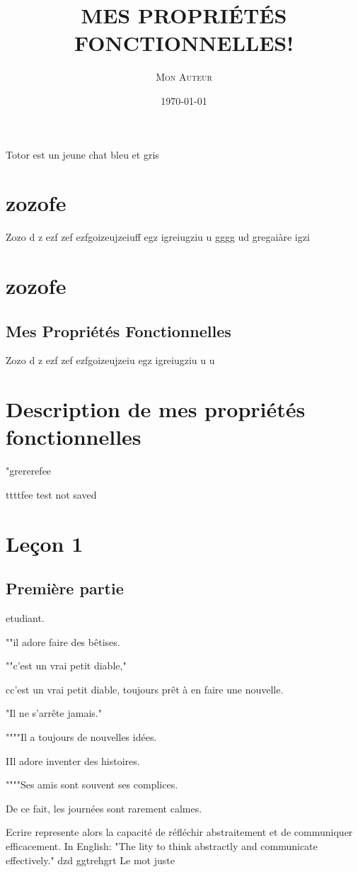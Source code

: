 \documentclass{article}
\title{\MakeUppercase{\textsc{Mes Propriétés Fonctionnelles!}}}
\author{\textsc{Mon Auteur}}
\date{\today}
\begin{document}
\maketitle

Totor est un jeune chat bleu et gris

\section{zozofe}

Zozo d
z
ezf
zef
ezfgoizeujzeiuff
egz
igreiugziu
u
gggg
ud
gregaiàre
igzi


\section{zozofe} \subsection{Mes Propriétés Fonctionnelles} Zozo d z ezf zef ezfgoizeujzeiu egz igreiugziu u u \section{Description de mes propriétés fonctionnelles}"grererefee

ttttfee
test
not saved

\section{Leçon 1} \subsection{Première partie}

etudiant.

""il adore faire des bêtises.

""c'est un vrai petit diable,"

cc'est un vrai petit diable, toujours prêt à en faire une nouvelle.

"Il ne s'arrête jamais."

""""Il a toujours de nouvelles idées.

IIl adore inventer des histoires.

""""Ses amis sont souvent ses complices.

De ce fait, les journées sont rarement calmes.



Ecrire represente alors la capacité de réfléchir abstraitement et de communiquer efficacement. In English: "The lity to think abstractly and communicate effectively." dzd ggtrehgrt
Le mot juste	
\end{document}
